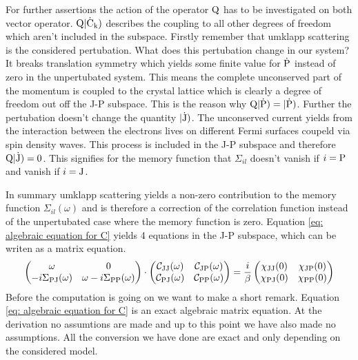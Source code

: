 For further assertions the action of the operator $\mathrm{Q}$ has to be investigated on both vector operator.
$\mathrm{Q} |\mathrm{\dot{\mathrm{C}}_{k}})$ describes the coupling to all other degrees of freedom which aren't included in the subspace.
Firstly remember that umklapp scattering is the considered pertubation.
What does this pertubation change in our system?
It breaks translation symmetry which yields some finite value for $\dot{\mathrm{P}}$ instead of zero in the unpertubated system.
This means the complete unconserved part of the momentum is coupled to the crystal lattice which is clearly a degree of freedom out off the J-P subspace.
This is the reason why $\mathrm{Q} |\mathrm{\dot{\mathrm{P}}}) = |\mathrm{\dot{\mathrm{P}}})$.
Further the pertubation doesn't change the quantity $|\mathrm{\dot{\mathrm{J}}})$.
The unconserved current yields from the interaction between the electrons lives on different Fermi surfaces coupeld via spin density waves.
This process is included in the J-P subspace and therefore $\mathrm{Q} |\mathrm{\dot{\mathrm{J}}}) = 0$.
This signifies for the memory function that $\Sigma_{il}$ doesn't vanish if $i=\mathrm{P}$ and vanish if $i=\mathrm{J}$.

In summary umklapp scattering yields a non-zero contribution to the memory function $\Sigma_{il}(\omega)$ and is therefore a correction of the correlation function instead of the unpertubated case where the memory function is zero.
Equation \eqref{eq: algebraic equation for C} yields 4 equations in the J-P subspace, which can be writen as a matrix equation.
%
\begin{align}
	\begin{pmatrix}
	\omega & 0 \\
	-i\Sigma_{\mathrm{PJ}}(\omega) & \omega - i\Sigma_{\mathrm{PP}}(\omega)
	\end{pmatrix}
	\cdot
	\begin{pmatrix}
	\mathcal{C}_{\mathrm{JJ}}(\omega) &  \mathcal{C}_{\mathrm{JP}}(\omega) \\
	\mathcal{C}_{\mathrm{PJ}}(\omega) &  \mathcal{C}_{\mathrm{PP}}(\omega)
	\end{pmatrix}
	=
	\frac{i}{\beta}
	\begin{pmatrix}
	\chi_{\mathrm{JJ}}(0) &  \chi_{\mathrm{JP}}(0) \\
	\chi_{\mathrm{PJ}}(0) &  \chi_{\mathrm{PP}}(0)
	\end{pmatrix}
	\label{eq: matric equation correlation function unconserved momentum}
\end{align}
%
Before the computation is going on we want to make a short remark.
Equation \eqref{eq: algebraic equation for C} is an exact algebraic matrix equation.
At the derivation no assumtions are made and up to this point we have also made no assumptions.
All the conversion we have done are exact and only depending on the considered model.

